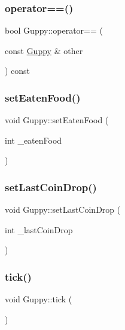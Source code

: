 \mbox{\label{class_guppy_a048b328073ca8bec199c50b41cbc4108}} 
\subsubsection{\texorpdfstring{operator==()}{operator==()}}
{\footnotesize\ttfamily bool Guppy\+::operator== (\begin{DoxyParamCaption}\item[{const \mbox{\hyperlink{class_guppy}{Guppy}} \&}]{other }\end{DoxyParamCaption}) const}

\mbox{\label{class_guppy_a718281abaf31796884adfe861ca8b491}} 
\subsubsection{\texorpdfstring{set\+Eaten\+Food()}{setEatenFood()}}
{\footnotesize\ttfamily void Guppy\+::set\+Eaten\+Food (\begin{DoxyParamCaption}\item[{int}]{\+\_\+eaten\+Food }\end{DoxyParamCaption})}

\mbox{\label{class_guppy_a39d8082e478435982f05baa6e64b0901}} 
\subsubsection{\texorpdfstring{set\+Last\+Coin\+Drop()}{setLastCoinDrop()}}
{\footnotesize\ttfamily void Guppy\+::set\+Last\+Coin\+Drop (\begin{DoxyParamCaption}\item[{int}]{\+\_\+last\+Coin\+Drop }\end{DoxyParamCaption})}

\mbox{\label{class_guppy_ab2f219fa29b0d22ee9702a55fede519b}} 
\subsubsection{\texorpdfstring{tick()}{tick()}}
{\footnotesize\ttfamily void Guppy\+::tick (\begin{DoxyParamCaption}{ }\end{DoxyParamCaption})\hspace{0.3cm}{\ttfamily [virtual]}}



